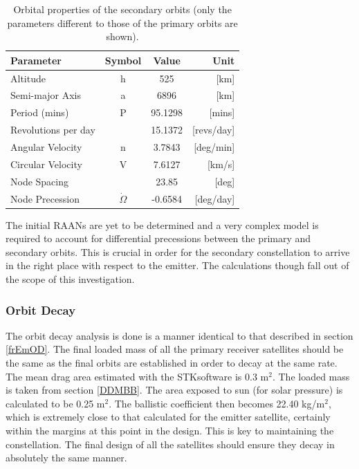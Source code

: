 \begin{table}[ht!]
\begin{centering}
\begin{tabular}{lccr}
\toprule
Parameter				&			Symbol			&			Value			&			Unit \\
\hline \hline
Altitude				&			h						&			525			&			[km]	 \\
Semi-major Axis	&			a						&			6896			&			[km]	 \\
Period (mins)		&			P						&			95.1298	&			[mins]	 \\
Revolutions per day		&									&			15.1372	&			[revs/day]	 \\
Angular Velocity		&			n						&			3.7843	&			[deg/min]	 \\
Circular Velocity		&			V						&			7.6127	&			[km/s]	 \\
Node Spacing	&			 						&			23.85	&			[deg]	 \\
Node Precession	&			 $\dot{\Omega}$					&			-0.6584	&			[deg/day]	 \\
\bottomrule
\end{tabular}
\caption{Orbital properties of the secondary orbits (only the parameters different to those of the primary orbits are shown).}
\label{table:orbsecref}
\end{centering}
\end{table}

The initial RAANs are yet to be determined and a very complex model is required to account for differential precessions between the primary and secondary orbits. This is crucial in order for the secondary constellation to arrive in the right place with respect to the emitter. The calculations though fall out of the scope of this investigation.

\subsubsection{Orbit Decay}
\label{frRecOD}

The orbit decay analysis is done is a manner identical to that described in section \ref{frEmOD}. The final loaded mass of all the primary receiver satellites should be the same as the final orbits are established in order to decay at the same rate. The mean drag area estimated with the STK\texttrademark software is 0.3 m$^2$. The loaded mass is taken from section \ref{DDMBB}. The area exposed to sun (for solar pressure) is calculated to be 0.25 m$^2$. The ballistic coefficient then becomes 22.40 kg/m$^2$, which is extremely close to that calculated for the emitter satellite, certainly within the margins at this point in the design. This is key to maintaining the constellation. The final design of all the satellites should ensure they decay in absolutely the same manner.

